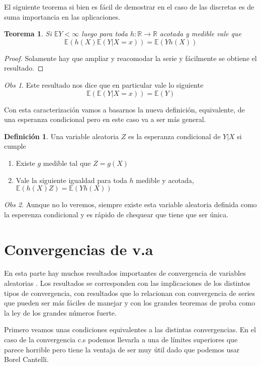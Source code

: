 \documentclass[11pt]{article}
\theoremstyle{plain} %
\newtheorem{teorema}{\color{rojo}Teorema}
\theoremstyle{definition}
\newtheorem*{definicion}{Definici\'{o}n} %
\theoremstyle{remark}
\newtheorem{obs}{Obs}
\def\E{\mathbb{E}}
\def\R{\mathbb{R}}
\def\va{variable aleatoria }
\def\vas{variables aleatorias }
\def\blue{\textcolor{blue!60!black}}
\begin{document}
El siguiente teorema si bien es fácil de demostrar en el caso de las discretas es de suma importancia en las aplicaciones.


\begin{teorema}	
	Si $\E Y < \infty$ luego para toda $h:\R \to \R$ acotada y medible vale que 
	\[ \E(h(X) \E(Y|X=x)) = \E (Yh(X))  \] 
\end{teorema}

\begin{proof}
	Solamente hay que ampliar y reacomodar la serie y fácilmente se obtiene el resultado.
\end{proof}

\begin{obs}
	Este resultado nos dice que en particular vale lo siguiente
	\[ \E( \E(Y|X=x)) = \E (Y)  \] 
\end{obs}

Con esta caracterización vamos a basarnos la nueva definición, equivalente, de una esperanza condicional pero en este caso va a ser más general.

\begin{definicion}
	Una \va $Z$ es la \blue{esperanza condicional} de $Y|X$ si cumple
	\begin{enumerate}
		\item Existe $g$ medible tal que $Z=g(X)$
		\item Vale la siguiente igualdad para toda $h$ medible y acotada, $\E(h(X) Z) = \E (Yh(X))$
	\end{enumerate}
\end{definicion}

\begin{obs}
	Aunque no lo veremos, siempre existe esta \va definida como la esperenza condicional y es rápido de chequear que tiene que ser única.
\end{obs}



\bigskip
\section{Convergencias de v.a}

En esta parte hay muchos resultados importantes de convergencia de \vas. Los resultados se corresponden con las implicaciones de los distintos tipos de convergencia, con resultados que lo relacionan con convergencia de series que pueden ser más fáciles de manejar y con los grandes teoremas de proba como la ley de los grandes números fuerte.

Primero veamos unas condiciones equivalentes a las distintas convergencias. En el caso de la convergencia c.s podemos llevarla a una de límites superiores que parece horrible pero tiene la ventaja de ser muy útil dado que podemos usar Borel Cantelli.
\end{document}
